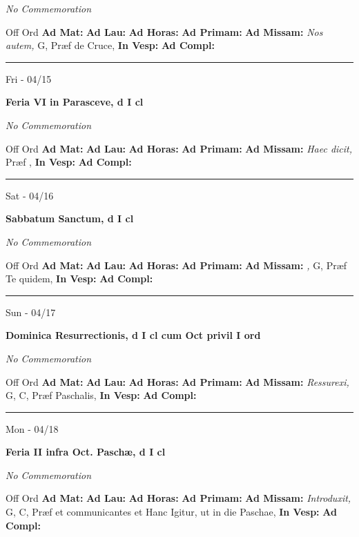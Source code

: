 \documentclass[letterpaper, 10pt]{article}
\begin{document}
\textit{No Commemoration}\begin{justify}
Off Ord
\textbf{Ad Mat: }
\textbf{Ad Lau: }
\textbf{Ad Horas: }
\textbf{Ad Primam: }
\textbf{Ad Missam:} \textit{Nos autem, } G, Præf de Cruce, 
\textbf{In Vesp: }
\textbf{Ad Compl: }\end{justify}



\hrule
\begin{center}
Fri - 04/15
\end{center}\textbf{ \large Feria VI in Parasceve, \textnormal{\normalsize d I cl}}

\textit{No Commemoration}\begin{justify}
Off Ord
\textbf{Ad Mat: }
\textbf{Ad Lau: }
\textbf{Ad Horas: }
\textbf{Ad Primam: }
\textbf{Ad Missam:} \textit{Haec dicit, } Præf , 
\textbf{In Vesp: }
\textbf{Ad Compl: }\end{justify}



\hrule
\begin{center}
Sat - 04/16
\end{center}\textbf{ \large Sabbatum Sanctum, \textnormal{\normalsize d I cl}}

\textit{No Commemoration}\begin{justify}
Off Ord
\textbf{Ad Mat: }
\textbf{Ad Lau: }
\textbf{Ad Horas: }
\textbf{Ad Primam: }
\textbf{Ad Missam:} \textit{, } G, Præf Te quidem, 
\textbf{In Vesp: }
\textbf{Ad Compl: }\end{justify}



\hrule
\begin{center}
Sun - 04/17
\end{center}\textbf{ \large Dominica Resurrectionis, \textnormal{\normalsize d I cl cum Oct privil I ord}}

\textit{No Commemoration}\begin{justify}
Off Ord
\textbf{Ad Mat: }
\textbf{Ad Lau: }
\textbf{Ad Horas: }
\textbf{Ad Primam: }
\textbf{Ad Missam:} \textit{Ressurexi, } G, C, Præf Paschalis, 
\textbf{In Vesp: }
\textbf{Ad Compl: }\end{justify}



\hrule
\begin{center}
Mon - 04/18
\end{center}\textbf{ \large Feria II infra Oct. Paschæ, \textnormal{\normalsize d I cl}}

\textit{No Commemoration}\begin{justify}
Off Ord
\textbf{Ad Mat: }
\textbf{Ad Lau: }
\textbf{Ad Horas: }
\textbf{Ad Primam: }
\textbf{Ad Missam:} \textit{Introduxit, } G, C, Præf et communicantes et Hanc Igitur, ut in die Paschae, 
\textbf{In Vesp: }
\textbf{Ad Compl: }\end{justify}
\end{document}
